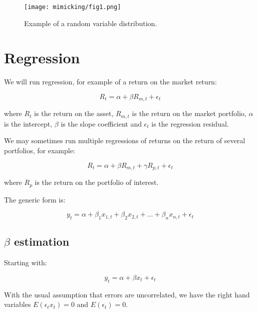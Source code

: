 \begin{figure}[!htbp]
    \centering
    \texttt{[image: mimicking/fig1.png]}
    \caption{Example of a random variable distribution.}
    \label{fig:randomvariable}
\end{figure}





\section{Regression}

We will run regression, for example of a return 
on the market return:

\begin{equation}
    \label{eq:regression}
    R_t = \alpha + \beta R_{m,t} + \epsilon_t
\end{equation}

where $R_t$ is the return on the asset, $R_{m,t}$ is the return on the market
portfolio, $\alpha$ is the intercept, $\beta$ is the slope coefficient and
$\epsilon_t$ is the regression residual.

We may sometimes run multiple regressions of returns on the return
of several portfolios, for example:

\begin{equation}
    \label{eq:multiregression}
    R_t = \alpha + \beta R_{m,t} + \gamma R_{p,t} + \epsilon_t
\end{equation}

where $R_p$ is the return on the portfolio of interest.

The generic form is:

\begin{equation}
    \label{eq:genericregression}
    y_t = \alpha + \beta_1 x_{1,t} + \beta_2 x_{2,t} + \ldots + \beta_n x_{n,t} + \epsilon_t
\end{equation}

\subsection{$\beta$ estimation}

Starting with:

\begin{equation}
y_t = \alpha + \beta x_t + \epsilon_t
\end{equation}

With the usual assumption that errors are uncorrelated, we have 
the right hand variables $E(\epsilon_t x_t) = 0$ and $E(\epsilon_t) = 0$.

